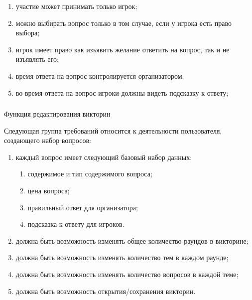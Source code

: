 \begin{enumerate}
	\item участие может принимать только игрок;
	\item можно выбирать вопрос только в том случае, если у игрока есть право выбора;
	\item игрок имеет право как изъявить желание ответить на вопрос, так и не изъявлять его;
	\item время ответа на вопрос контролируется организатором;
	\item во время ответа на вопрос игроки должны видеть подсказку к ответу;
\end{enumerate}

\subsubsection{} Функция редактирования викторин
\label{sec:domain:specification:edit}

Следующая группа требований относится к деятельности пользователя, создающего набор вопросов:

\begin{enumerate}
	\item каждый вопрос имеет следующий базовый набор данных:
	\begin{enumerate}
		\item содержимое и тип содержимого вопроса;
		\item цена вопроса;
		\item правильный ответ для организатора;
		\item подсказка к ответу для игроков.
	\end{enumerate}
	\item должна быть возможность изменять общее количество раундов в викторине; 
	\item должна быть возможность изменять количество тем в каждом раунде;
	\item должна быть возможность изменять количество вопросов в каждой теме;
	\item должна быть возможность открытия/сохранения викторин.
\end{enumerate}